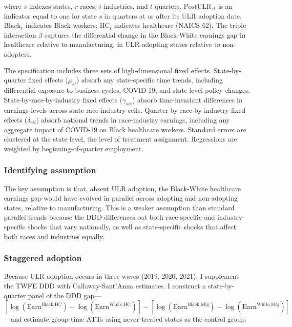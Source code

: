 \documentclass[12pt]{article}
\begin{document}
\noindent where $s$ indexes states, $r$ races, $i$ industries, and $t$ quarters. $\text{PostULR}_{st}$ is an indicator equal to one for state $s$ in quarters at or after its ULR adoption date. $\text{Black}_r$ indicates Black workers; $\text{HC}_i$ indicates healthcare (NAICS 62). The triple interaction $\beta$ captures the differential change in the Black-White earnings gap in healthcare relative to manufacturing, in ULR-adopting states relative to non-adopters.

The specification includes three sets of high-dimensional fixed effects. State-by-quarter fixed effects ($\mu_{st}$) absorb any state-specific time trends, including differential exposure to business cycles, COVID-19, and state-level policy changes. State-by-race-by-industry fixed effects ($\gamma_{sri}$) absorb time-invariant differences in earnings levels across state-race-industry cells. Quarter-by-race-by-industry fixed effects ($\delta_{rit}$) absorb national trends in race-industry earnings, including any aggregate impact of COVID-19 on Black healthcare workers. Standard errors are clustered at the state level, the level of treatment assignment. Regressions are weighted by beginning-of-quarter employment.

\subsubsection*{Identifying assumption} The key assumption is that, absent ULR adoption, the Black-White healthcare earnings gap would have evolved in parallel across adopting and non-adopting states, relative to manufacturing. This is a weaker assumption than standard parallel trends because the DDD differences out both race-specific and industry-specific shocks that vary nationally, as well as state-specific shocks that affect both races and industries equally.

\subsubsection*{Staggered adoption} Because ULR adoption occurs in three waves (2019, 2020, 2021), I supplement the TWFE DDD with Callaway-Sant'Anna \citeyearpar{callaway2021did} estimates. I construct a state-by-quarter panel of the DDD gap---$[\log(\text{Earn}^{\text{Black,HC}}) - \log(\text{Earn}^{\text{White,HC}})] - [\log(\text{Earn}^{\text{Black,Mfg}}) - \log(\text{Earn}^{\text{White,Mfg}})]$---and estimate group-time ATTs using never-treated states as the control group.
\end{document}
